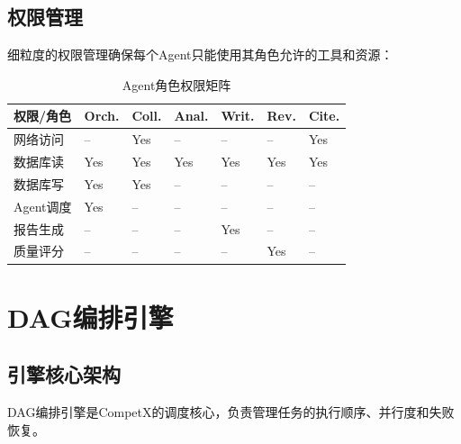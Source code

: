 \documentclass[12pt,a4paper]{ctexrep}
\begin{document}
\subsection{权限管理}

细粒度的权限管理确保每个Agent只能使用其角色允许的工具和资源：

\begin{table}[H]
\centering
\caption{Agent角色权限矩阵}
\label{tab:permissions}
{\small
\begin{tabular}{p{2.5cm} >{\centering\arraybackslash}p{1.5cm} >{\centering\arraybackslash}p{1.5cm} >{\centering\arraybackslash}p{1.5cm} >{\centering\arraybackslash}p{1.5cm} >{\centering\arraybackslash}p{1.5cm} >{\centering\arraybackslash}p{1.5cm}}
\toprule
\textbf{权限/角色} & \textbf{Orch.} & \textbf{Coll.} & \textbf{Anal.} & \textbf{Writ.} & \textbf{Rev.} & \textbf{Cite.} \\
\midrule
网络访问 & -- & Yes & -- & -- & -- & Yes \\
数据库读 & Yes & Yes & Yes & Yes & Yes & Yes \\
数据库写 & Yes & Yes & -- & -- & -- & -- \\
Agent调度 & Yes & -- & -- & -- & -- & -- \\
报告生成 & -- & -- & -- & Yes & -- & -- \\
质量评分 & -- & -- & -- & -- & Yes & -- \\
\bottomrule
\end{tabular}
}
\end{table}

\section{DAG编排引擎}

\subsection{引擎核心架构}

DAG编排引擎是CompetX的调度核心，负责管理任务的执行顺序、并行度和失败恢复。
\end{document}
